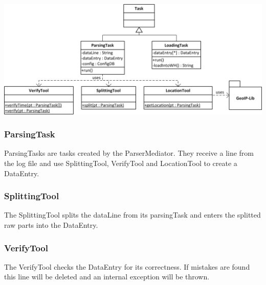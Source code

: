 


\newpage
\begin{center}
\includegraphics[width=1\linewidth]{Pictures/Parts/TaskTool.png}
\end{center}

\subsubsection*{ParsingTask}
ParsingTasks are tasks created by the ParserMediator. They receive a line from the log file and use  
SplittingTool, VerifyTool and LocationTool to create a DataEntry. 


\subsubsection*{SplittingTool}
The SplittingTool splits the dataLine from its parsingTask and enters the splitted raw parts into the DataEntry.

\subsubsection*{VerifyTool}
The VerifyTool checks the DataEntry for its correctness. %
If mistakes are found this line will be deleted and an internal exception will be thrown. 

